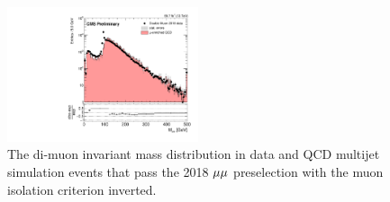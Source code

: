 \begin{figure}
\centering
\includegraphics[width=0.5\textwidth]{figures/bg/mumuInvMass_qcd_vs_data.pdf}
\caption{The di-muon invariant mass distribution in data and QCD multijet simulation events that pass the 2018 ${\mu}{\mu}$ preselection with the muon isolation criterion inverted.}
\label{mumu_inv_mass_inverted_iso}
\end{figure}